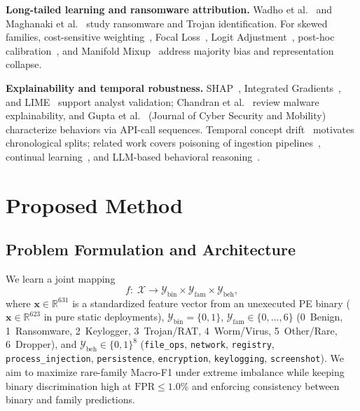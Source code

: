 \documentclass[Number]{sn-jnl}
\begin{document}
\noindent\textbf{Long-tailed learning and ransomware attribution.}
Wadho et al.~\cite{wadho2026benchmarking} and Maghanaki et al.~\cite{maghanaki2026feature} study ransomware and Trojan identification. For skewed families, cost-sensitive weighting~\cite{elkan2001foundations,cui2019class}, Focal Loss~\cite{lin2017focal}, Logit Adjustment~\cite{menon2021long}, post-hoc calibration~\cite{zadrozny2001obtaining}, and Manifold Mixup~\cite{verma2019manifold} address majority bias and representation collapse.

\noindent\textbf{Explainability and temporal robustness.}
SHAP~\cite{lundberg2017unified}, Integrated Gradients~\cite{sundararajan2017axiomatic}, and LIME~\cite{ribeiro2016why} support analyst validation; Chandran et al.~\cite{chandran2025static} review malware explainability, and Gupta et al.~\cite{gupta2018malware} (Journal of Cyber Security and Mobility) characterize behaviors via API-call sequences. Temporal concept drift~\cite{joyce2025ember2024} motivates chronological splits; related work covers poisoning of ingestion pipelines~\cite{dolejs2026graybox}, continual learning~\cite{rahman2025madar}, and LLM-based behavioral reasoning~\cite{saul2026trident,zheng2026knowing}.


\section{Proposed Method}\label{sec:methodology}

\subsection{Problem Formulation and Architecture}\label{subsec:problem}

We learn a joint mapping
\begin{equation}
  f:\; \mathcal{X} \to \mathcal{Y}_\text{bin} \times \mathcal{Y}_\text{fam} \times \mathcal{Y}_\text{beh},
\end{equation}
where $\mathbf{x} \in \mathbb{R}^{631}$ is a standardized feature vector from an unexecuted PE binary ($\mathbf{x} \in \mathbb{R}^{623}$ in pure static deployments), $\mathcal{Y}_\text{bin}=\{0,1\}$, $\mathcal{Y}_\text{fam}\in\{0,\dots,6\}$ (0~Benign, 1~Ransomware, 2~Keylogger, 3~Trojan/RAT, 4~Worm/Virus, 5~Other/Rare, 6~Dropper), and $\mathcal{Y}_\text{beh}\in\{0,1\}^8$ (\texttt{file\_ops}, \texttt{network}, \texttt{registry}, \texttt{process\_}\allowbreak\texttt{injection}, \texttt{persistence}, \texttt{encryption}, \texttt{keylogging}, \texttt{screenshot}). We aim to maximize rare-family Macro-F1 under extreme imbalance while keeping binary discrimination high at $\text{FPR}\le 1.0\%$ and enforcing consistency between binary and family predictions.
\end{document}

